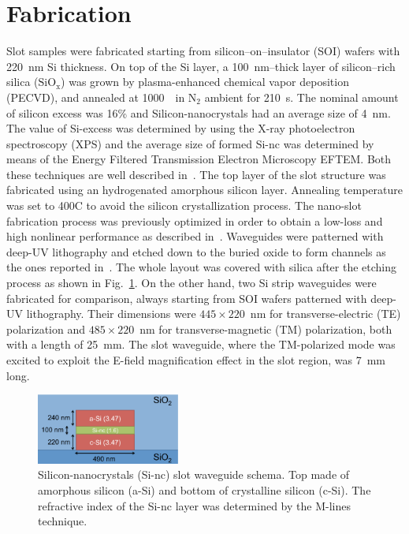 \documentclass[10pt,letterpaper]{article}
\begin{document}
\section{Fabrication}
Slot samples were fabricated starting from silicon--on--insulator (SOI) wafers with 220~nm Si thickness. On top of the Si layer, a 100~nm--thick layer of silicon--rich silica ($ \mathrm{SiO_x} $) was grown by plasma-enhanced chemical vapor deposition (PECVD), and annealed at 1000~\textcelsius ~in $ \mathrm{N}_2 $ ambient for 210~s. The nominal amount of silicon excess was 16\% and Silicon-nanocrystals had an average size of 4~nm. The value of Si-excess was determined by using the X-ray photoelectron spectroscopy (XPS) and the average size of formed Si-nc was determined by means of the Energy Filtered Transmission Electron Microscopy EFTEM. Both these techniques are well described in~\cite{Garcia2004}. The top layer of the slot structure was fabricated using an hydrogenated amorphous silicon layer. Annealing temperature was set to 400\textdegree C to avoid the silicon crystallization process. The nano-slot fabrication process was previously optimized in order to obtain a low-loss and high nonlinear performance as described in~\cite{Jordana2007}. Waveguides were patterned with 
deep-UV lithography and etched down to the buried oxide to form channels as the ones reported in~\cite{Martinez2010a, Trita2011}. The whole layout was covered with silica after the etching process as shown in Fig.~\ref{fig:semSlot}. On the other hand, two Si strip waveguides were fabricated for comparison, always starting  from SOI wafers patterned with deep-UV lithography. Their dimensions were $445\times220$~nm for transverse-electric (TE) polarization and $485\times220$~nm for transverse-magnetic (TM) polarization, both with a length of 25~mm. The slot waveguide, where the TM-polarized mode was excited to exploit the E-field magnification effect in the slot region, was 7~mm long.


\begin{figure}[htb]
\centering
\includegraphics[width=0.42\textwidth]{slot5}%
\caption{Silicon-nanocrystals (Si-nc) slot waveguide schema. Top made of amorphous silicon (a-Si) and bottom of crystalline silicon (c-Si). The refractive index of the Si-nc layer was determined by the M-lines technique.}
\label{fig:semSlot}
\end{figure}
\end{document}
